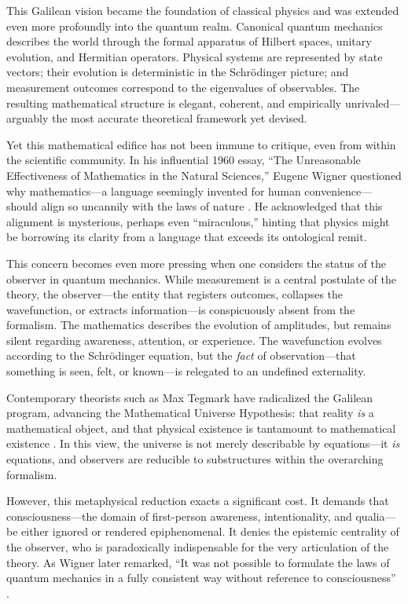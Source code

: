 \documentclass[11pt]{article}
\numberwithin{equation}{section} %
\begin{document}
This Galilean vision became the foundation of classical physics and was extended even more profoundly into the quantum realm. Canonical quantum mechanics describes the world through the formal apparatus of Hilbert spaces, unitary evolution, and Hermitian operators. Physical systems are represented by state vectors; their evolution is deterministic in the Schrödinger picture; and measurement outcomes correspond to the eigenvalues of observables. The resulting mathematical structure is elegant, coherent, and empirically unrivaled—arguably the most accurate theoretical framework yet devised.

Yet this mathematical edifice has not been immune to critique, even from within the scientific community. In his influential 1960 essay, “The Unreasonable Effectiveness of Mathematics in the Natural Sciences,” Eugene Wigner questioned why mathematics—a language seemingly invented for human convenience—should align so uncannily with the laws of nature \cite{wigner1960}. He acknowledged that this alignment is mysterious, perhaps even “miraculous,” hinting that physics might be borrowing its clarity from a language that exceeds its ontological remit.

This concern becomes even more pressing when one considers the status of the observer in quantum mechanics. While measurement is a central postulate of the theory, the observer—the entity that registers outcomes, collapses the wavefunction, or extracts information—is conspicuously absent from the formalism. The mathematics describes the evolution of amplitudes, but remains silent regarding awareness, attention, or experience. The wavefunction evolves according to the Schrödinger equation, but the \textit{fact} of observation—that something is seen, felt, or known—is relegated to an undefined externality.

Contemporary theorists such as Max Tegmark have radicalized the Galilean program, advancing the Mathematical Universe Hypothesis: that reality \textit{is} a mathematical object, and that physical existence is tantamount to mathematical existence \cite{tegmark2008}. In this view, the universe is not merely describable by equations—it \textit{is} equations, and observers are reducible to substructures within the overarching formalism.

However, this metaphysical reduction exacts a significant cost. It demands that consciousness—the domain of first-person awareness, intentionality, and qualia—be either ignored or rendered epiphenomenal. It denies the epistemic centrality of the observer, who is paradoxically indispensable for the very articulation of the theory. As Wigner later remarked, “It was not possible to formulate the laws of quantum mechanics in a fully consistent way without reference to consciousness” \cite{wigner1961}.
\end{document}
